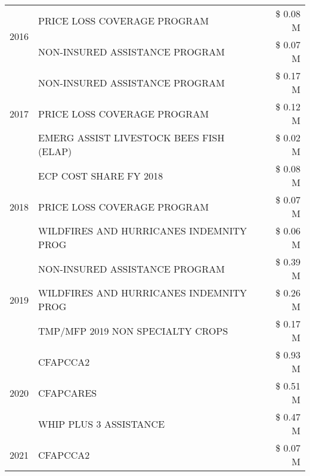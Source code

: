 \begin{tabular}{llr}
\cline{1-3}
\multirow[t]{2}{*}{2016} & PRICE LOSS COVERAGE PROGRAM                   & \$ 0.08 M \\
 & NON-INSURED ASSISTANCE PROGRAM                & \$ 0.07 M \\
\cline{1-3}
\multirow[t]{3}{*}{2017} & NON-INSURED ASSISTANCE PROGRAM & \$ 0.17 M \\
 & PRICE LOSS COVERAGE PROGRAM & \$ 0.12 M \\
 & EMERG ASSIST LIVESTOCK BEES FISH (ELAP) & \$ 0.02 M \\
\cline{1-3}
\multirow[t]{3}{*}{2018} & ECP COST SHARE FY 2018 & \$ 0.08 M \\
 & PRICE LOSS COVERAGE PROGRAM & \$ 0.07 M \\
 & WILDFIRES AND HURRICANES INDEMNITY PROG & \$ 0.06 M \\
\cline{1-3}
\multirow[t]{3}{*}{2019} & NON-INSURED ASSISTANCE PROGRAM & \$ 0.39 M \\
 & WILDFIRES AND HURRICANES INDEMNITY PROG & \$ 0.26 M \\
 & TMP/MFP 2019 NON SPECIALTY CROPS & \$ 0.17 M \\
\cline{1-3}
\multirow[t]{3}{*}{2020} & CFAPCCA2 & \$ 0.93 M \\
 & CFAPCARES & \$ 0.51 M \\
 & WHIP PLUS 3 ASSISTANCE & \$ 0.47 M \\
\cline{1-3}
2021 & CFAPCCA2 & \$ 0.07 M \\
\cline{1-3}
\bottomrule
\end{tabular}
